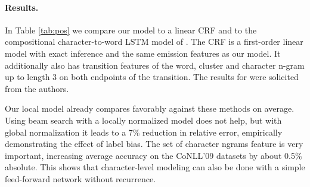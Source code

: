 \documentclass[11pt]{article}
\begin{document}
\paragraph{Results.}

In Table \ref{tab:pos} we compare our model
to a linear CRF and to the compositional
character-to-word LSTM model of .
The CRF is a first-order linear model with exact inference and
the same emission features as our model. It additionally also
has transition features of the
word, cluster and character n-gram up to length 3 on both endpoints of the
transition.
The results for 
were solicited from the authors.

Our local model already compares favorably against these methods on average.
Using beam search with a locally normalized model does not help, but with global normalization
it leads to a 7\% reduction in relative error, empirically demonstrating the effect of label bias.
The set of character ngrams feature is very important, increasing average
accuracy on the CoNLL'09 datasets by about 0.5\% absolute. 
This shows that character-level modeling can also be done with a simple feed-forward
network without recurrence.
\end{document}
